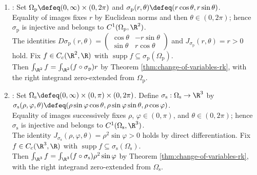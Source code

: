 \begin{example} \label{ex:polar-and-spherical-jacobians} 
\begin{enumerate}[label=(\roman*)]
\setlength{\itemsep}{0pt}
\item {}: Set $\Omega_{\mathrm p}\defeq(0,\infty)\times(0,2\pi)$ and $\sigma_{\mathrm p}(r,\theta)\defeq(r\cos\theta,r\sin\theta)$.\\
Equality of images fixes $r$ by Euclidean norms and then $\theta\in(0,2\pi)$; hence $\sigma_{\mathrm p}$ is injective and belongs to $C^1(\Omega_{\mathrm p},\R^2)$.\\
The identities $D\sigma_{\mathrm p}(r,\theta)=\left(\begin{smallmatrix}\cos\theta&-r\sin\theta\\\sin\theta&r\cos\theta\end{smallmatrix}\right)$ and $J_{\sigma_{\mathrm p}}(r,\theta)=r>0$ hold. Fix $f\in C_c(\R^2,\R)$ with $\operatorname{supp}f\subseteq\sigma_{\mathrm p}(\Omega_{\mathrm p})$.\\
Then $\int_{\R^2}f=\int_{\R^2}(f\circ\sigma_{\mathrm p})r$ by Theorem \ref{thm:change-of-variables-rk}, with the right integrand zero-extended from $\Omega_{\mathrm p}$.
\item {}: Set $\Omega_{\mathrm s}\defeq(0,\infty)\times(0,\pi)\times(0,2\pi)$. Define $\sigma_{\mathrm s}:\Omega_{\mathrm s}\to\R^3$ by $\sigma_{\mathrm s}(\rho,\varphi,\theta)\defeq(\rho\sin\varphi\cos\theta,\rho\sin\varphi\sin\theta,\rho\cos\varphi)$.\\
Equality of images successively fixes $\rho$, $\varphi\in(0,\pi)$, and $\theta\in(0,2\pi)$; hence $\sigma_{\mathrm s}$ is injective and belongs to $C^1(\Omega_{\mathrm s},\R^3)$.\\
The identity $J_{\sigma_{\mathrm s}}(\rho,\varphi,\theta)=\rho^2\sin\varphi>0$ holds by direct differentiation. Fix $f\in C_c(\R^3,\R)$ with $\operatorname{supp}f\subseteq\sigma_{\mathrm s}(\Omega_{\mathrm s})$.\\
Then $\int_{\R^3}f=\int_{\R^3}(f\circ\sigma_{\mathrm s})\rho^2\sin\varphi$ by Theorem \ref{thm:change-of-variables-rk}, with the right integrand zero-extended from $\Omega_{\mathrm s}$.
\end{enumerate}
\end{example}


